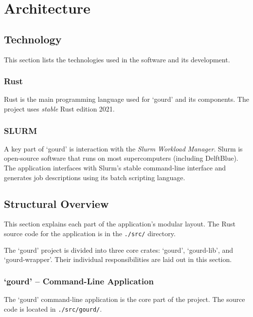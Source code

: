 \pagebreak


\section{Architecture}\label{sec:architecture}

\subsection{Technology}

This section lists the technologies used in the software and its development.

\subsubsection{Rust}

Rust is the main programming language used for `gourd' and its components.
The project uses \emph{stable} Rust edition 2021.

\subsubsection{SLURM}

A key part of `gourd' is interaction with the \emph{Slurm Workload Manager}.
Slurm is open-source software that runs on most supercomputers (including
DelftBlue). The application interfaces with Slurm's stable command-line
interface and generates job descriptions using its batch scripting language.

\subsection{Structural Overview}

This section explains each part of the application's modular layout.
The Rust source code for the application is in the \verb|./src/| directory.

The `gourd' project is divided into three core crates:
`gourd', `gourd-lib', and `gourd-wrapper'.
Their individual responsibilities are laid out in this section.

\subsubsection{`gourd' -- Command-Line Application}

The `gourd' command-line application is the core part of the project.
The source code is located in \verb|./src/gourd/|.

